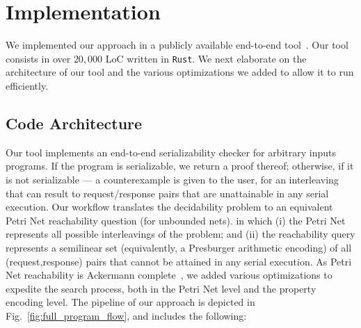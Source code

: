 

\section{Implementation}
\label{sec:implementation}

We implemented our approach in a publicly available end-to-end tool~\cite{ArtifactRepository}. Our tool consists in over $20{,}000$ LoC written in \texttt{Rust}.
%
We next elaborate on the architecture of our tool and the various optimizations we added to allow it to run efficiently.





\subsection{Code Architecture}

\label{subsec:codeArchitecture}

Our tool implements an end-to-end serializability checker for arbitrary inputs programs. If the program is serializable, we return a proof thereof; otherwise, if it is not serializable --- a counterexample is given to the user, for an interleaving that can result to request/response pairs that are unattainable in any serial execution.
%
Our workflow translates the decidability problem to an equivalent Petri Net reachability question (for unbounded nets). in which (i) the Petri Net represents all possible interleavings of the problem; and (ii) the reachability query represents a semilinear set (equivalently, a Presburger arithmetic encoding) of all (request,response) pairs that cannot be attained in any serial execution.
%
As Petri Net reachability is Ackermann complete~\cite{CzWo22}, we added various optimizations to expedite the search process, both in the Petri Net level and the property encoding level.
%
The pipeline of our approach is depicted in Fig.~\ref{fig:full_program_flow}, and includes the following:
 

